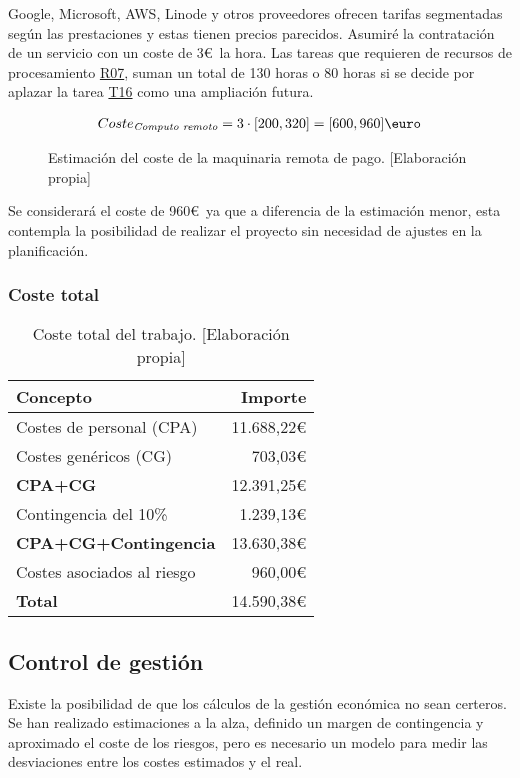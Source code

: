 Google, Microsoft, AWS, Linode y otros proveedores ofrecen tarifas segmentadas según
las prestaciones y estas tienen precios parecidos. Asumiré la contratación de un servicio con un coste de 3\euro\ la hora.
Las tareas que requieren de recursos de procesamiento \hyperref[R07]{R07}, suman un total de
130 horas o 80 horas si se decide por aplazar la tarea \hyperref[T16]{T16} como una ampliación futura.
\begin{figure}[H]
    \begin{align*}
        Coste_{\textit{Computo remoto}} = 3 \cdot [200, 320] = [600, 960]\text{\euro}
    \end{align*}
    \caption{Estimación del coste de la maquinaria remota de pago.  [Elaboración propia]}
\end{figure}
Se considerará el coste de 960\euro\ ya que a diferencia de la estimación menor, esta contempla la posibilidad de
realizar el proyecto sin necesidad de ajustes en la planificación.


\begin{table}[H]
    \subsubsection{Coste total}
    \begin{center}
        \begin{tabular}{ l r }
         Concepto & Importe \\
         \hline
         Costes de personal (CPA) & 11.688,22\euro \\
         Costes genéricos (CG) & 703,03\euro \\
         \textbf{CPA+CG} & 12.391,25\euro \\
         Contingencia del 10\% & 1.239,13\euro \\
         \textbf{CPA+CG+Contingencia} & 13.630,38\euro \\
         Costes asociados al riesgo & 960,00\euro \\ 
         \hline \hline
         \textbf{Total} & 14.590,38\euro
        \end{tabular}
        \caption{Coste total del trabajo. [Elaboración propia]}\label{totalcosttable}
    \end{center}
\end{table}

\subsection{Control de gestión}
Existe la posibilidad de que los cálculos de la gestión económica no sean certeros.
Se han realizado estimaciones a la alza, definido un margen de contingencia y aproximado el coste de los riesgos,
pero es necesario un modelo para medir las desviaciones entre los costes estimados y el real.

